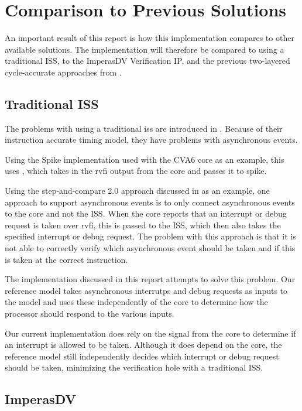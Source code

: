 \section{Comparison to Previous Solutions}

An important result of this report is how this implementation compares to other available solutions. The implementation will therefore be compared to using a traditional ISS, to the ImperasDV Verification IP, and the previous two-layered cycle-accurate approaches from . 

\subsection{Traditional ISS}

The problems with using a traditional \acrshort{iss} are introduced in .
Because of their instruction accurate timing model, they have problems with asynchronous events. 

Using the Spike implementation used with the CVA6 core as an example, this uses , which takes in the rvfi output from the core and passes it to spike. 

Using the step-and-compare 2.0 approach discussed in \cite{taylorAdvancedRISCVVerification2023} as an example, one approach to support asynchronous events is to only connect asynchronous events to the core and not the ISS. When the core reports that an interrupt or debug request is taken over \acrshort{rvfi}, this is passed to the ISS, which then also takes the specified interrupt or debug request. The problem with this approach is that it is not able to correctly verify which asynchronous event should be taken and if this is taken at the correct instruction. 

The implementation discussed in this report attempts to solve this problem. Our reference model takes asynchronous interrutps and debug requests as inputs to the model and uses these independently of the core to determine how the processor should respond to the various inputs. 

Our current implementation does rely on the  signal from the core to determine if an interrupt is allowed to be taken. Although it does depend on the core, the reference model still independently decides which interrupt or debug request should be taken, minimizing the verification hole with a traditional ISS.

\subsection{ImperasDV}

